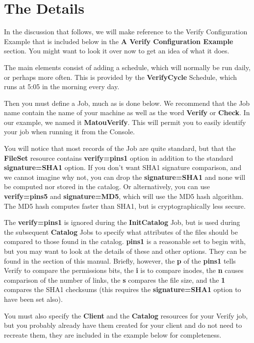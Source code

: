 \section{The Details}

In the discussion that follows, we will make reference to the Verify
Configuration Example that is included below in the {\bf A Verify
Configuration Example} section. You might want to look it over now to get an
idea of what it does. 

The main elements consist of adding a schedule, which will normally be run
daily, or perhaps more often. This is provided by the {\bf VerifyCycle}
Schedule, which runs at 5:05 in the morning every day. 

Then you must define a Job, much as is done below. We recommend that the Job
name contain the name of your machine as well as the word {\bf Verify} or {\bf
Check}. In our example, we named it {\bf MatouVerify}. This will permit you to
easily identify your job when running it from the Console. 

You will notice that most records of the Job are quite standard, but that the
{\bf FileSet} resource contains {\bf verify=pins1} option in addition to the
standard {\bf signature=SHA1} option. If you don't want SHA1 signature
comparison, and we cannot imagine why not, you can drop the {\bf
signature=SHA1} and none will be computed nor stored in the catalog. Or
alternatively, you can use {\bf verify=pins5} and {\bf signature=MD5}, which
will use the MD5 hash algorithm. The MD5 hash computes faster than SHA1, but
is cryptographically less secure. 

The {\bf verify=pins1} is ignored during the {\bf InitCatalog} Job, but is
used during the subsequent {\bf Catalog} Jobs to specify what attributes of
the files should be compared to those found in the catalog. {\bf pins1} is a
reasonable set to begin with, but you may want to look at the details of these
and other options. They can be found in the 
 section of this manual.
Briefly, however, the {\bf p} of the {\bf pins1} tells Verify to compare the
permissions bits, the {\bf i} is to compare inodes, the {\bf n} causes
comparison of the number of links, the {\bf s} compares the file size, and the
{\bf 1} compares the SHA1 checksums (this requires the {\bf signature=SHA1}
option to have been set also). 

You must also specify the {\bf Client} and the {\bf Catalog} resources for
your Verify job, but you probably already have them created for your client
and do not need to recreate them, they are included in the example below for
completeness. 

